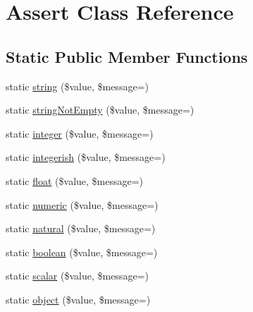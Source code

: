 \hypertarget{class_webmozart_1_1_assert_1_1_assert}{}\section{Assert Class Reference}
\label{class_webmozart_1_1_assert_1_1_assert}
\subsection*{Static Public Member Functions}
\begin{DoxyCompactItemize}
\item 
static \mbox{\hyperlink{class_webmozart_1_1_assert_1_1_assert_a5a6be8d05541e044810a8c6ec9d2c5fc}{string}} (\$value, \$message=\textquotesingle{}\textquotesingle{})
\item 
static \mbox{\hyperlink{class_webmozart_1_1_assert_1_1_assert_a2bb05c19c963c649ee04a0f660b7592b}{string\+Not\+Empty}} (\$value, \$message=\textquotesingle{}\textquotesingle{})
\item 
static \mbox{\hyperlink{class_webmozart_1_1_assert_1_1_assert_adfbf9670153c5f490d9a365cec35c431}{integer}} (\$value, \$message=\textquotesingle{}\textquotesingle{})
\item 
static \mbox{\hyperlink{class_webmozart_1_1_assert_1_1_assert_a04d796ebe15ccd4309a7d9600ecfa24b}{integerish}} (\$value, \$message=\textquotesingle{}\textquotesingle{})
\item 
static \mbox{\hyperlink{class_webmozart_1_1_assert_1_1_assert_acab536a2831cad5378fb12ea6b7ab2e5}{float}} (\$value, \$message=\textquotesingle{}\textquotesingle{})
\item 
static \mbox{\hyperlink{class_webmozart_1_1_assert_1_1_assert_aa1d29bda8446c0b1c0a1568cea3ff0b6}{numeric}} (\$value, \$message=\textquotesingle{}\textquotesingle{})
\item 
static \mbox{\hyperlink{class_webmozart_1_1_assert_1_1_assert_ae605aae559a44d19b00ab8c959c71da0}{natural}} (\$value, \$message=\textquotesingle{}\textquotesingle{})
\item 
static \mbox{\hyperlink{class_webmozart_1_1_assert_1_1_assert_a99b6d6afab4e7ac26c6129f8e8374014}{boolean}} (\$value, \$message=\textquotesingle{}\textquotesingle{})
\item 
static \mbox{\hyperlink{class_webmozart_1_1_assert_1_1_assert_ac042844f602474675888166b2ecf72b2}{scalar}} (\$value, \$message=\textquotesingle{}\textquotesingle{})
\item 
static \mbox{\hyperlink{class_webmozart_1_1_assert_1_1_assert_a1364d8c65b28f8d5c8082007050fe992}{object}} (\$value, \$message=\textquotesingle{}\textquotesingle{})

\end{DoxyCompactItemize}
